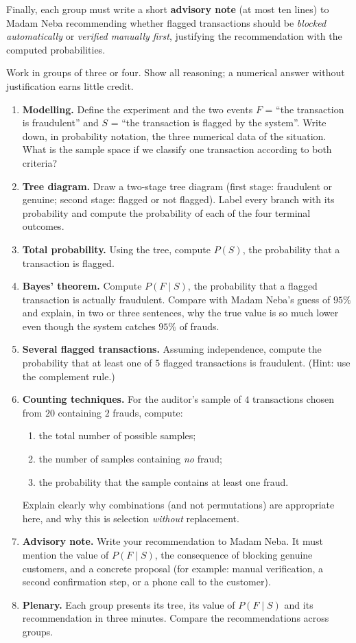 \documentclass[11pt]{article}
\newcounter{popsec}
\newcounter{popsub}
\newcommand{\courssub}[1]{%
  \stepcounter{popsub}%
  \par\vspace{9pt}\noindent{\popxbold\fontsize{11.5}{13}\selectfont\color{popink}{\color{poporange}\thepopsec.\thepopsub}\hspace{6pt}#1}\par\nopagebreak\vspace{4pt}
}
\begin{document}
Finally, each group must write a short \textbf{advisory note} (at most ten lines) to Madam Neba recommending whether flagged transactions should be \emph{blocked automatically} or \emph{verified manually first}, justifying the recommendation with the computed probabilities.

\courssub{Tasks}

Work in groups of three or four. Show all reasoning; a numerical answer without justification earns little credit.

\begin{enumerate}
\item \textbf{Modelling.} Define the experiment and the two events $F$ = ``the transaction is fraudulent'' and $S$ = ``the transaction is flagged by the system''. Write down, in probability notation, the three numerical data of the situation. What is the sample space if we classify one transaction according to both criteria?
\item \textbf{Tree diagram.} Draw a two-stage tree diagram (first stage: fraudulent or genuine; second stage: flagged or not flagged). Label every branch with its probability and compute the probability of each of the four terminal outcomes.
\item \textbf{Total probability.} Using the tree, compute $P(S)$, the probability that a transaction is flagged.
\item \textbf{Bayes' theorem.} Compute $P(F \mid S)$, the probability that a flagged transaction is actually fraudulent. Compare with Madam Neba's guess of $95\%$ and explain, in two or three sentences, why the true value is so much lower even though the system catches $95\%$ of frauds.
\item \textbf{Several flagged transactions.} Assuming independence, compute the probability that at least one of $5$ flagged transactions is fraudulent. (Hint: use the complement rule.)
\item \textbf{Counting techniques.} For the auditor's sample of $4$ transactions chosen from $20$ containing $2$ frauds, compute:
\begin{enumerate}
\item the total number of possible samples;
\item the number of samples containing \emph{no} fraud;
\item the probability that the sample contains at least one fraud.
\end{enumerate}
Explain clearly why combinations (and not permutations) are appropriate here, and why this is selection \emph{without} replacement.
\item \textbf{Advisory note.} Write your recommendation to Madam Neba. It must mention the value of $P(F \mid S)$, the consequence of blocking genuine customers, and a concrete proposal (for example: manual verification, a second confirmation step, or a phone call to the customer).
\item \textbf{Plenary.} Each group presents its tree, its value of $P(F \mid S)$ and its recommendation in three minutes. Compare the recommendations across groups.
\end{enumerate}
\end{document}
